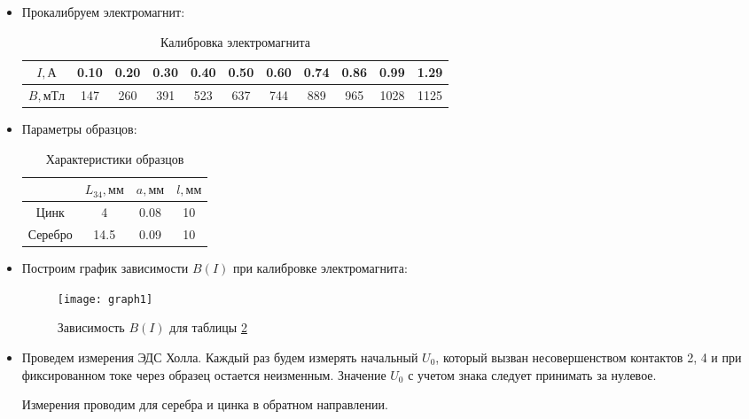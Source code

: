 \documentclass{lab}
\begin{document}
\begin{itemize}
\item
Прокалибруем электромагнит:
\begin{table}[H]
	\centering
	\renewcommand{\arraystretch}{1.3}
		\begin{tabular}{|c|cccccccccc|}
			\hline
			$ I, А $	& 0.10	& 0.20	& 0.30	& 0.40	& 0.50	& 0.60	& 0.74	& 0.86	& 0.99	& 1.29\\ \hline
			$ B, мТл $	& 147	& 260	& 391	& 523	& 637	& 744	& 889	& 965	& 1028	& 1125\\ \hline
	\end{tabular}
	\renewcommand{\arraystretch}{1}
	\caption{\footnotesize Калибровка электромагнита}
	\label{tab1}
\end{table}

\item
Параметры образцов:
\begin{table}[H]
	\centering
	\renewcommand{\arraystretch}{1.3}
		\begin{tabular}{|c|ccc|}
			\hline
						& $ L_{34}, мм $	& $ a, мм $	& $ l, мм $ \\ \hline
			$ Цинк $	& 4		& 0.08		& 10 \\ \hline
			$ Серебро $	& 14.5	& 0.09		& 10 \\ \hline
	\end{tabular}
	\renewcommand{\arraystretch}{1}
	\caption{\footnotesize Характеристики образцов}
	\label{tab0}
\end{table}

\item
Построим график зависимости $ B(I) $ при калибровке электромагнита:

\begin{figure}[H]
	\centering
	\texttt{[image: graph1]}
	\caption{\footnotesize Зависимость $ B(I) $ для таблицы \ref{tab0}}
\end{figure}

\newpage

\item
Проведем измерения ЭДС Холла. Каждый раз будем измерять начальный $ U_0 $, который вызван
несовершенством контактов 2, 4 и при фиксированном токе через образец остается неизменным.
Значение $ U_0 $ с учетом знака следует принимать за нулевое.

Измерения проводим для серебра и цинка в обратном направлении.


\end{itemize}
\end{document}

